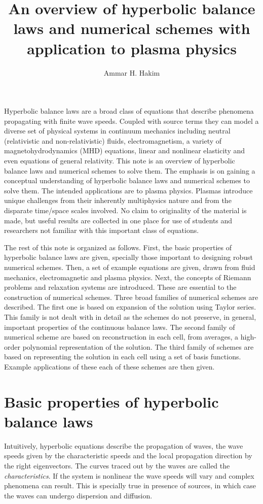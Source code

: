 \documentclass[11pt, reqno]{amsart}
\title[Hyperbolic balance laws]{An overview of hyperbolic balance laws
  and numerical schemes with application to plasma physics}%
\author{Ammar H. Hakim}%
\date{}
\theoremstyle{definition}
\begin{document}
\maketitle

Hyperbolic balance laws are a broad class of equations that describe
phenomena propagating with finite wave speeds. Coupled with source
terms they can model a diverse set of physical systems in continuum
mechanics including neutral (relativistic and non-relativistic)
fluids, electromagnetism, a variety of magnetohydrodynamics (MHD)
equations, linear and nonlinear elasticity and even equations of
general relativity. This note is an overview of hyperbolic balance
laws and numerical schemes to solve them. The emphasis is on gaining a
conceptual understanding of hyperbolic balance laws and numerical
schemes to solve them. The intended applications are to plasma
physics. Plasmas introduce unique challenges from their inherently
multiphysics nature and from the disparate time/space scales
involved. No claim to originality of the material is made, but useful
results are collected in one place for use of students and researchers
not familiar with this important class of equations.

The rest of this note is organized as follows. First, the basic
properties of hyperbolic balance laws are given, specially those
important to designing robust numerical schemes. Then, a set of
example equations are given, drawn from fluid mechanics,
electromagnetic and plasma physics. Next, the concepts of Riemann
problems and relaxation systems are introduced. These are essential to
the construction of numerical schemes. Three broad families of
numerical schemes are described. The first one is based on expansion
of the solution using Taylor series. This family is not dealt with in
detail as the schemes do not preserve, in general, important
properties of the continuous balance laws. The second family of
numerical scheme are based on reconstruction in each cell, from
averages, a high-order polynomial representation of the solution. The
third family of schemes are based on representing the solution in each
cell using a set of basis functions. Example applications of these
each of these schemes are then given.

\section{Basic properties of hyperbolic balance laws}

Intuitively, hyperbolic equations describe the propagation of waves,
the wave speeds given by the characteristic speeds and the local
propagation direction by the right eigenvectors. The curves traced out
by the waves are called the \emph{characteristics}. If the system is
nonlinear the wave speeds will vary and complex phenomena can
result. This is specially true in presence of sources, in which case
the waves can undergo dispersion and diffusion.
\end{document}
